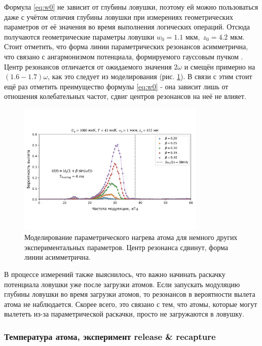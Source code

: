 Формула \ref{eq:w0} не зависит от глубины ловушки, поэтому ей можно пользоваться даже с учётом отличия глубины ловушки при измерениях геометрических параметров от её значения во время выполнения логических операций. Отсюда получаются геометрические параметры ловушки $w_0 = 1.1 \text{ мкм}, \; z_0 = 4.2 \text{ мкм}$. Стоит отметить, что форма линии параметрических резонансов асимметрична, что связано с ангармонизмом потенциала, формируемого гауссовым пучком \cite{Param_Heating_Friebel,J_uregui_2001}. Центр резонансов отличается от ожидаемого значения $2\omega$ и смещён примерно на $(1.6-1.7)\omega$, как это следует из моделирования (рис. \ref{fig:parametric_test}). В связи с этим стоит ещё раз отметить преимущество формулы \ref{eq:w0} - она зависит лишь от отношения колебательных частот, сдвиг центров резонансов на неё не влияет.

\begin{figure}[ht]
	\centering
	\includegraphics[width=0.8\textwidth]{images/parametric_test.pdf}
	\caption{Моделирование параметрического нагрева атома для немного других экспериментальных параметров. Центр резонанса сдвинут, форма линии асимметрична.}
	\label{fig:parametric_test}
\end{figure}

В процессе измерений также выяснилось, что важно начинать раскачку потенциала ловушки уже после загрузки атомов. Если запускать модуляцию глубины ловушки во время загрузки атомов, то резонансов в вероятности вылета атома не наблюдается. Скорее всего, это связано с тем, что атомы, которые могут вылететь из-за параметрической раскачки, просто не загружаются в ловушку. 

\subsubsection{Температура атома, эксперимент release \& recapture}

